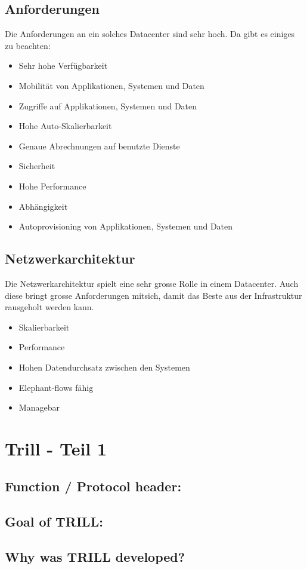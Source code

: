 \documentclass[a4,12pt]{scrartcl}
\begin{document}
\subsection{Anforderungen}
Die Anforderungen an ein solches Datacenter sind sehr hoch. Da gibt es einiges zu beachten: 
\begin{itemize}
\item Sehr hohe Verfügbarkeit 
\item Mobilität von Applikationen, Systemen und Daten
\item Zugriffe auf Applikationen, Systemen und Daten 
\item Hohe Auto-Skalierbarkeit 
\item Genaue Abrechnungen auf benutzte Dienste 
\item Sicherheit 
\item Hohe Performance 
\item Abhängigkeit 
\item Autoprovisioning von Applikationen, Systemen und Daten
\end{itemize}

\subsection{Netzwerkarchitektur}
Die Netzwerkarchitektur spielt eine sehr grosse Rolle in einem Datacenter. Auch diese bringt grosse Anforderungen mitsich, damit das Beste aus der Infrastruktur rausgeholt werden kann. 
\begin{itemize}
\item Skalierbarkeit
\item Performance 
\item Hohen Datendurchsatz zwischen den Systemen
\item Elephant-flows fähig 
\item Managebar 
\end{itemize}

\section{Trill - Teil 1}
\subsection{Function / Protocol header:} 
\subsection{Goal of TRILL:}
\subsection{Why was TRILL developed?}
\end{document}
